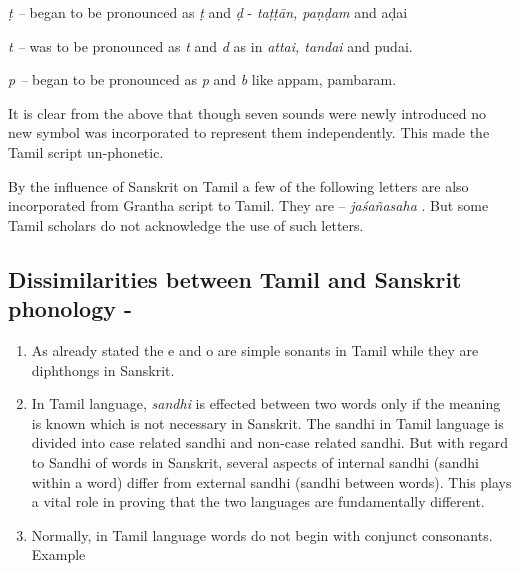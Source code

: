 \begin{myquote}
\textit{ṭ –} began to be pronounced as \textit{ṭ} and \textit{ḍ} - \textit{taṭṭān, paṇḍam} and aḍai
\end{myquote}

\begin{myquote}
\textit{t –} was to be pronounced as \textit{t} and \textit{d} as in \textit{attai, tandai} and pudai.
\end{myquote}

\begin{myquote}
\textit{p –} began to be pronounced as \textit{p} and \textit{b} like appam, pambaram.
\end{myquote}

It is clear from the above that though seven sounds were newly introduced no new symbol was incorporated to represent them independently. This made the Tamil script un-phonetic.

By the influence of Sanskrit on Tamil a few of the following letters are also incorporated from Grantha script to Tamil. They are – \textit{jaśañasaha}   . But some Tamil scholars do not acknowledge the use of such letters.


\subsection*{Dissimilarities between Tamil and Sanskrit phonology -}

\begin{enumerate}[{\rm 1)}]
\itemsep=0pt
\item As already stated the e and o are simple sonants in Tamil while they are diphthongs in Sanskrit.

 \item In Tamil language, \textit{sandhi} is effected between two words only if the meaning is known which is not necessary in Sanskrit. The sandhi in Tamil language is divided into case related sandhi and non-case related sandhi. But with regard to Sandhi of words in Sanskrit, several aspects of internal sandhi (sandhi within a word) differ from external sandhi (sandhi between words). This plays a vital role in proving that the two languages are fundamentally different.

 \item Normally, in Tamil language words do not begin with conjunct consonants. Example

\end{enumerate}

